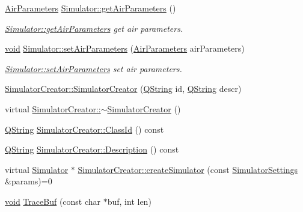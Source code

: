 \begin{DoxyCompactItemize}
\item 
\hyperlink{struct_air_parameters}{\-Air\-Parameters} \hyperlink{group___h_i_t_l_plugin_ga68df0005072e39f3a7208aa63944f4dd}{\-Simulator\-::get\-Air\-Parameters} ()
\begin{DoxyCompactList}\small\item\em \hyperlink{group___h_i_t_l_plugin_ga68df0005072e39f3a7208aa63944f4dd}{\-Simulator\-::get\-Air\-Parameters} get air parameters. \end{DoxyCompactList}\item 
\hyperlink{group___u_a_v_objects_plugin_ga444cf2ff3f0ecbe028adce838d373f5c}{void} \hyperlink{group___h_i_t_l_plugin_ga2425318c670bb0ddcba4dcf35f891bee}{\-Simulator\-::set\-Air\-Parameters} (\hyperlink{struct_air_parameters}{\-Air\-Parameters} air\-Parameters)
\begin{DoxyCompactList}\small\item\em \hyperlink{group___h_i_t_l_plugin_ga2425318c670bb0ddcba4dcf35f891bee}{\-Simulator\-::set\-Air\-Parameters} set air parameters. \end{DoxyCompactList}\item 
\hyperlink{group___h_i_t_l_plugin_gad78ac7b6a64456e259fcb9aba94f4947}{\-Simulator\-Creator\-::\-Simulator\-Creator} (\hyperlink{group___u_a_v_objects_plugin_gab9d252f49c333c94a72f97ce3105a32d}{\-Q\-String} id, \hyperlink{group___u_a_v_objects_plugin_gab9d252f49c333c94a72f97ce3105a32d}{\-Q\-String} descr)
\item 
virtual \hyperlink{group___h_i_t_l_plugin_ga07d44da289771bf1bc8cf9dd01d5cb13}{\-Simulator\-Creator\-::$\sim$\-Simulator\-Creator} ()
\item 
\hyperlink{group___u_a_v_objects_plugin_gab9d252f49c333c94a72f97ce3105a32d}{\-Q\-String} \hyperlink{group___h_i_t_l_plugin_ga4195682a513bc0ddf6818ff4058d2619}{\-Simulator\-Creator\-::\-Class\-Id} () const 
\item 
\hyperlink{group___u_a_v_objects_plugin_gab9d252f49c333c94a72f97ce3105a32d}{\-Q\-String} \hyperlink{group___h_i_t_l_plugin_ga1ace675dc4a400f644b7e6f7506f65e9}{\-Simulator\-Creator\-::\-Description} () const 
\item 
virtual \hyperlink{class_simulator}{\-Simulator} $\ast$ \hyperlink{group___h_i_t_l_plugin_ga2511a02773cadaf9c503a89172622837}{\-Simulator\-Creator\-::create\-Simulator} (const \hyperlink{group___h_i_t_l_plugin_ga052199f1328d3002bce3e45345aa7f4e}{\-Simulator\-Settings} \&params)=0
\item 
\hyperlink{group___u_a_v_objects_plugin_ga444cf2ff3f0ecbe028adce838d373f5c}{void} \hyperlink{group___h_i_t_l_plugin_ga5b9f24733c0869a10f3ff9ccd27fc6d2}{\-Trace\-Buf} (const char $\ast$buf, int len)

\end{DoxyCompactItemize}
